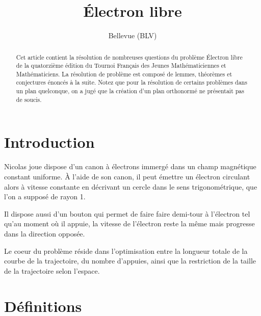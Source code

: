 \documentclass{amsart}
\theoremstyle{definition}
\theoremstyle{remark}
\numberwithin{equation}{section}
\begin{document}
\title{Électron libre}

\author{Bellevue (BLV)}

\begin{abstract}
    Cet article contient la résolution de nombreuses questions du problème \og Électron libre \fg{} de la quatorzième édition du Tournoi Français
    des Jeunes Mathématiciennes et Mathématiciens. La résolution de problème est composé de lemmes, théorèmes et conjectures énoncés à la suite. 
    Notez que pour la résolution de certains problèmes dans un plan quelconque, on a jugé que la création d'un plan orthonormé ne présentait pas de soucis.

\end{abstract}

\maketitle

\tableofcontents

\section{Introduction}

Nicolas joue dispose d’un canon à électrons immergé dans un champ magnétique constant uniforme. À l'aide de son canon, il peut émettre un électron 
circulant alors à vitesse constante en décrivant un cercle dans le sens trigonométrique, que l'on a supposé de rayon 1. 

Il dispose aussi d’un bouton qui permet de faire faire demi-tour à l’électron tel qu'au moment où il appuie, la vitesse de l’électron reste la même 
mais progresse dans la direction opposée.

Le coeur du problème réside dans l'optimisation entre la longueur totale de la courbe de la trajectoire, du nombre d'appuies, ainsi que la restriction 
de la taille de la trajectoire selon l'espace.\newpage
\section{Définitions}
\end{document}
